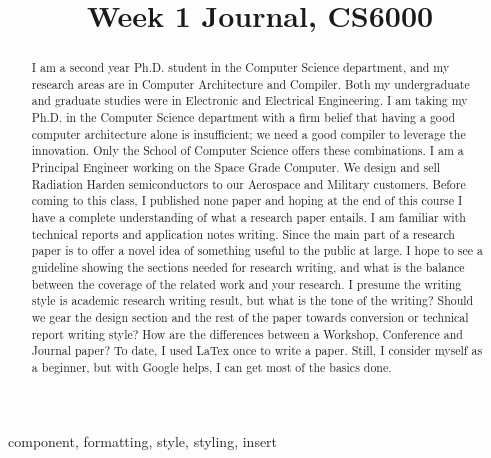 \documentclass[conference]{IEEEtran}
\begin{document}
\title{Week 1 Journal, CS6000}


\author{

}

\maketitle

\begin{abstract}

I am a second year Ph.D. student in the Computer Science department, and my research areas are in Computer Architecture and Compiler. Both my undergraduate and graduate studies were in Electronic and Electrical Engineering. I am taking my Ph.D. in the Computer Science department with a firm belief that having a good computer architecture alone is insufficient; we need a good compiler to leverage the innovation. Only the School of Computer Science offers these combinations.   
I am a Principal Engineer working on the Space Grade Computer. We design and sell Radiation Harden semiconductors to our Aerospace and Military customers. Before coming to this class, I published none paper and hoping at the end of this course I have a complete understanding of what a research paper entails. I am familiar with technical reports and application notes writing.  Since the main part of a research paper is to offer a novel idea of something useful to the public at large. I hope to see a guideline showing the sections needed for research writing, and what is the balance between the coverage of the related work and your research. I presume the writing style is academic research writing result, but what is the tone of the writing? Should we gear the design section and the rest of the paper towards conversion or technical report writing style? How are the differences between a Workshop, Conference and Journal paper? To date, I used LaTex once to write a paper. Still, I consider myself as a beginner, but with Google helps, I can get most of the basics done.
\end{abstract}

\begin{IEEEkeywords}
component, formatting, style, styling, insert
\end{IEEEkeywords}
\end{document}
